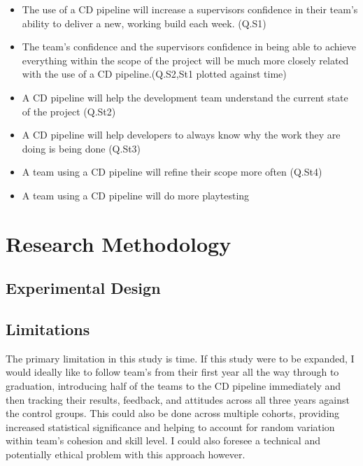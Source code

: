 \documentclass[lettersize,journal]{IEEEtran}
\begin{document}
    \begin{itemize}
        \item The use of a CD pipeline will increase a supervisors confidence in their team's ability to deliver a new, working build each week. (Q.S1)
        \item The team's confidence and the supervisors confidence in being able to achieve everything within the scope of the project will be much more closely related with the use of a CD pipeline.(Q.S2,St1 plotted against time)
        \item A CD pipeline will help the development team understand the current state of the project (Q.St2)
        \item A CD pipeline will help developers to always know why the work they are doing is being done (Q.St3)
        \item A team using a CD pipeline will refine their scope more often (Q.St4)
        \item A team using a CD pipeline will do more playtesting
    \end{itemize}

\section{Research Methodology}
    \subsection{Experimental Design}
        

    \subsection{Limitations}
        The primary limitation in this study is time. If this study were to be expanded, I would ideally like to follow team's from their first year all the way through to graduation, introducing half of the teams to the CD pipeline immediately and then tracking their results, feedback, and attitudes across all three years against the control groups. This could also be done across multiple cohorts, providing increased statistical significance and helping to account for random variation within team's cohesion and skill level. I could also foresee a technical and potentially ethical problem with this approach however.
        
\end{document}
